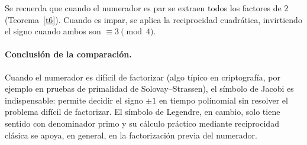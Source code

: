 \begin{observacion}
Se recuerda que cuando el numerador es par se extraen todos los factores de $2$ (Teorema~\ref{t6}). Cuando es impar, se aplica la reciprocidad cuadrática, invirtiendo el signo cuando ambos son $\equiv 3\pmod4$.
\end{observacion}

\paragraph{Conclusión de la comparación.} Cuando el numerador es difícil de factorizar (algo típico en criptografía, por ejemplo en pruebas de primalidad de Solovay--Strassen), el símbolo de Jacobi es indispensable: permite decidir el signo $\pm1$ en tiempo polinomial sin resolver el problema difícil de factorizar. El símbolo de Legendre, en cambio, solo tiene sentido con denominador primo y su cálculo práctico mediante reciprocidad clásica se apoya, en general, en la factorización previa del numerador.


